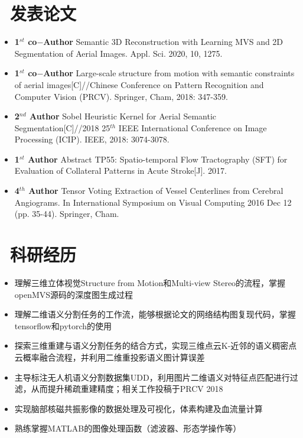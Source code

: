 \documentclass{resume}
\begin{document}
\section{\faBookmark\ 发表论文}
\begin{itemize}
    \item \textbf{1$^{st}$ co$-$Author} Semantic 3D Reconstruction with Learning MVS and 2D Segmentation of Aerial Images. Appl. Sci. 2020, 10, 1275. 
    \item \textbf{1$^{st}$ co$-$Author} Large-scale structure from motion with semantic constraints of aerial images[C]//Chinese Conference on Pattern Recognition and Computer Vision (PRCV). Springer, Cham, 2018: 347-359.
	\item \textbf{2$^{nd}$ Author} Sobel Heuristic Kernel for Aerial Semantic Segmentation[C]//2018 25$^{th}$ IEEE International Conference on Image Processing (ICIP). IEEE, 2018: 3074-3078.
	\item \textbf{1$^{st}$ Author} Abstract TP55: Spatio-temporal Flow Tractography (SFT) for Evaluation of Collateral Patterns in Acute Stroke[J]. 2017.
	\item \textbf{4$^{th}$ Author} Tensor Voting Extraction of Vessel Centerlines from Cerebral Angiograms. In International Symposium on Visual Computing 2016 Dec 12 (pp. 35-44). Springer, Cham. 
\end{itemize}


\section{\faFlask\ 科研经历}

\begin{itemize}
    \item 理解三维立体视觉Structure from Motion和Multi-view Stereo的流程，掌握openMVS源码的深度图生成过程
    \item 理解二维语义分割任务的工作流，能够根据论文的网络结构图复现代码，掌握tensorflow和pytorch的使用
    \item 探索三维重建与语义分割任务的结合方式，实现三维点云K-近邻的语义稠密点云概率融合流程，并利用二维重投影语义图计算误差
	\item 主导标注无人机语义分割数据集UDD，利用图片二维语义对特征点匹配进行过滤，从而提升稀疏重建精度；相关工作投稿于PRCV 2018
\end{itemize}

\begin{itemize}[parsep=0.5ex]
  \item 实现脑部核磁共振影像的数据处理及可视化，体素构建及血流量计算
  \item 熟练掌握MATLAB的图像处理函数（滤波器、形态学操作等）
\end{itemize}
\end{document}

